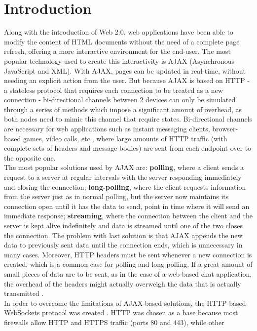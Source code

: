 \documentclass[conference]{IEEEtran}
\begin{document}
\section{Introduction}
Along with the introduction of Web 2.0, web applications have been able to
modify the content of HTML documents without the need of a complete page
refresh, offering a more interactive environment for the end-user.
The most popular technology used to create this interactivity is AJAX \cite{AJAX}
(Asynchronous JavaScript and XML). With AJAX, pages can be updated in real-time,
without needing an explicit action from the user. But because AJAX is based on
HTTP - a stateless protocol that requires each connection to be treated as a new
connection - bi-directional channels between 2 devices can only be simulated
through a series of methods which impose a significant amount of overhead, as both
nodes need to mimic this channel that require states.
Bi-directional channels are necessary for web applications such as instant
messaging clients, browser-based games, video calls, etc., where large amounts
of HTTP traffic (with complete sets of headers and message bodies) are sent from
each endpoint over to the opposite one.
\\
\indent
The most popular solutions used by AJAX are: \textbf{polling}, where a client sends
a request to a server at regular intervals with the server responding immediately
and closing the connection; \textbf{long-polling}, where the client requests
information from the server just as in normal polling, but the server now maintains
its connection open until it has the data to send, point in time where
it will send an immediate response;
\textbf{streaming}, where the connection between the client and the server is
kept alive indefinitely and data is streamed until one of the two closes the
connection. The problem with last solution is that AJAX
appends the new data to previously sent data until the connection ends, which is
unnecessary in many cases. Moreover, HTTP headers must be sent whenever a new
connection is created, which is a common case for polling and long-polling. If
a great amount of small pieces of data are to be sent, as in the case of a
web-based chat application, the overhead of the headers might actually overweigh
the data that is actually transmitted \cite{2009:Misc}.
\\
\indent
In order to overcome the limitations of AJAX-based solutions, the HTTP-based
WebSockets protocol was created \cite{RFC}. HTTP was chosen as a base because
most firewalls allow HTTP and HTTPS traffic  (ports 80 and 443), while other
\end{document}
